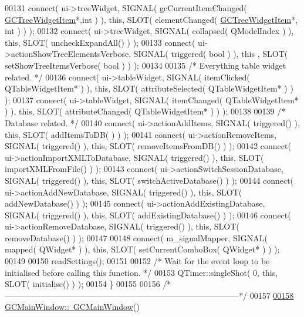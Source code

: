 \begin{DoxyCode}
00131   connect( ui->treeWidget, SIGNAL( gcCurrentItemChanged( \hyperlink{class_g_c_tree_widget_item}{GCTreeWidgetItem}*,\textcolor{keywordtype}{int} 
      ) ), \textcolor{keyword}{this}, SLOT( elementChanged( \hyperlink{class_g_c_tree_widget_item}{GCTreeWidgetItem}*, \textcolor{keywordtype}{int} ) ) );
00132   connect( ui->treeWidget, SIGNAL( collapsed( QModelIndex ) ), \textcolor{keyword}{this}, SLOT( 
      uncheckExpandAll() ) );
00133   connect( ui->actionShowTreeElementsVerbose, SIGNAL( triggered( \textcolor{keywordtype}{bool} ) ), \textcolor{keyword}{this}
      , SLOT( setShowTreeItemsVerbose( \textcolor{keywordtype}{bool} ) ) );
00134 
00135   \textcolor{comment}{/* Everything table widget related. */}
00136   connect( ui->tableWidget, SIGNAL( itemClicked( QTableWidgetItem* ) ), \textcolor{keyword}{this}, 
      SLOT( attributeSelected( QTableWidgetItem* ) ) );
00137   connect( ui->tableWidget, SIGNAL( itemChanged( QTableWidgetItem* ) ), \textcolor{keyword}{this}, 
      SLOT( attributeChanged( QTableWidgetItem* ) ) );
00138 
00139   \textcolor{comment}{/* Database related. */}
00140   connect( ui->actionAddItems, SIGNAL( triggered() ), \textcolor{keyword}{this}, SLOT( addItemsToDB(
      ) ) );
00141   connect( ui->actionRemoveItems, SIGNAL( triggered() ), \textcolor{keyword}{this}, SLOT( 
      removeItemsFromDB() ) );
00142   connect( ui->actionImportXMLToDatabase, SIGNAL( triggered() ), \textcolor{keyword}{this}, SLOT( 
      importXMLFromFile() ) );
00143   connect( ui->actionSwitchSessionDatabase, SIGNAL( triggered() ), \textcolor{keyword}{this}, SLOT( 
      switchActiveDatabase() ) );
00144   connect( ui->actionAddNewDatabase, SIGNAL( triggered() ), \textcolor{keyword}{this}, SLOT( 
      addNewDatabase() ) );
00145   connect( ui->actionAddExistingDatabase, SIGNAL( triggered() ), \textcolor{keyword}{this}, SLOT( 
      addExistingDatabase() ) );
00146   connect( ui->actionRemoveDatabase, SIGNAL( triggered() ), \textcolor{keyword}{this}, SLOT( 
      removeDatabase() ) );
00147 
00148   connect( m\_signalMapper, SIGNAL( mapped( QWidget* ) ), \textcolor{keyword}{this}, SLOT( 
      setCurrentComboBox( QWidget* ) ) );
00149 
00150   readSettings();
00151 
00152   \textcolor{comment}{/* Wait for the event loop to be initialised before calling this function. */}
00153   QTimer::singleShot( 0, \textcolor{keyword}{this}, SLOT( initialise() ) );
00154 \}
00155 
00156 \textcolor{comment}{/*
      --------------------------------------------------------------------------------------*/}
00157 
\hypertarget{gcmainwindow_8cpp_source_l00158}{}\hyperlink{class_g_c_main_window_a1b9394727a4790a926fae15973f9e629}{00158} \hyperlink{class_g_c_main_window_a1b9394727a4790a926fae15973f9e629}{GCMainWindow::~GCMainWindow}()

\end{DoxyCode}
